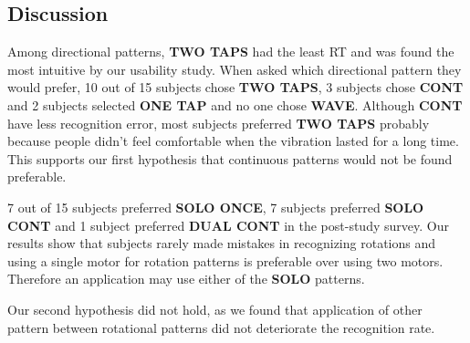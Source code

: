 \subsection{Discussion}

Among directional patterns, \textbf{TWO TAPS} had the least RT and was found the most intuitive by our usability study. When asked which directional pattern they would prefer, 10 out of 15 subjects chose \textbf{TWO TAPS}, 3 subjects chose \textbf{CONT} and 2 subjects selected \textbf{ONE TAP} and no one chose \textbf{WAVE}. Although \textbf{CONT} have less recognition error, most subjects preferred \textbf{TWO TAPS} probably because people didn't feel comfortable when the vibration lasted for a long time. This supports our first hypothesis that continuous patterns would not be found preferable.

7 out of 15 subjects preferred \textbf{SOLO ONCE}, 7 subjects preferred \textbf{SOLO CONT} and 1 subject preferred \textbf{DUAL CONT} in the post-study survey. Our results show that subjects rarely made mistakes in recognizing rotations and using a single motor for rotation patterns is preferable over using two motors. Therefore an application may use either of the \textbf{SOLO} patterns. 

Our second hypothesis did not hold, as we found that application of other pattern between rotational patterns did not deteriorate the recognition rate.